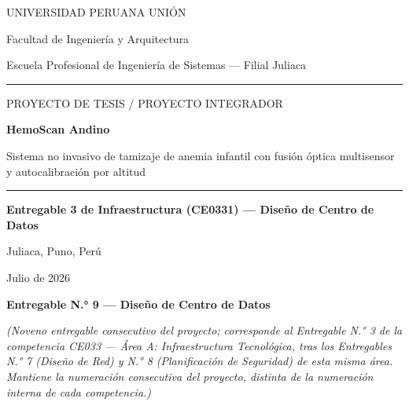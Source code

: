 \documentclass[11pt,a4paper]{article}
\begin{document}
\begin{titlepage}
\centering
\vspace*{1.2cm}
{\large UNIVERSIDAD PERUANA UNI\'ON\par}
{\normalsize Facultad de Ingenier\'ia y Arquitectura\par}
{\normalsize Escuela Profesional de Ingenier\'ia de Sistemas --- Filial Juliaca\par}
\vspace{0.5cm}
\rule{0.6\linewidth}{0.4pt}
\vspace{1.6cm}

{\large PROYECTO DE TESIS / PROYECTO INTEGRADOR\par}
\vspace{1.0cm}
{\huge\bfseries HemoScan Andino\par}
\vspace{0.6cm}
{\Large Sistema no invasivo de tamizaje de anemia infantil con fusi\'on \'optica multisensor y autocalibraci\'on por altitud\par}
\vspace{1.6cm}
\rule{0.6\linewidth}{0.4pt}
\vspace{1.6cm}

{\Large\bfseries Entregable 3 de Infraestructura (CE0331) --- Dise\~no de Centro de Datos\par}
\vspace{2.0cm}

{\normalsize Juliaca, Puno, Per\'u \par}
{\normalsize Julio de 2026\par}

\vfill
\end{titlepage}

\tableofcontents
\newpage

\textbf{Entregable N.° 9 --- Diseño de Centro de Datos}

\emph{(Noveno entregable consecutivo del proyecto; corresponde al Entregable N.° 3 de la competencia CE033 --- Área A: Infraestructura Tecnológica, tras los Entregables N.° 7 (Diseño de Red) y N.° 8 (Planificación de Seguridad) de esta misma área. Mantiene la numeración consecutiva del proyecto, distinta de la numeración interna de cada competencia.)}
\end{document}
